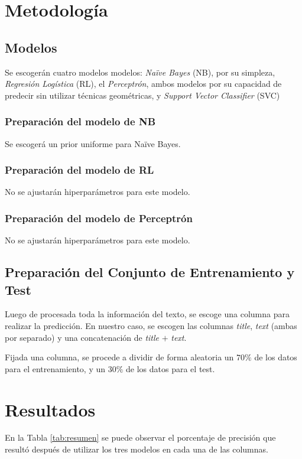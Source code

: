 \section{Metodología}
{
\subsection{Modelos}
Se escogerán cuatro modelos modelos:  \textit{Naïve Bayes} (NB), por su simpleza, \textit{Regresión Logística} (RL), el \textit{Perceptrón}, ambos modelos por su capacidad de predecir sin utilizar técnicas geométricas, y \textit{Support Vector Classifier} (SVC)

\subsubsection{Preparación del modelo de NB} 
Se escogerá un prior uniforme para Naïve Bayes.

\subsubsection{Preparación del modelo de RL}
No se ajustarán hiperparámetros para este modelo.

\subsubsection{Preparación del modelo de Perceptrón}
No se ajustarán hiperparámetros para este modelo.

\subsection{Preparación del Conjunto de Entrenamiento y Test}
Luego de procesada toda la información del texto, se escoge una columna para realizar la predicción. En nuestro caso, se escogen las columnas \textit{title}, \textit{text} (ambas por separado) y una concatenación de \textit{title} $+$ \textit{text}. 

Fijada una columna, se procede a dividir de forma aleatoria un $70\%$ de los datos para el entrenamiento, y un $30\%$ de los datos para el test.

}

\section{Resultados}
{
En la Tabla \ref{tab:resumen} se puede observar el porcentaje de precisión que resultó después de utilizar los tres modelos en cada una de las columnas.


}

